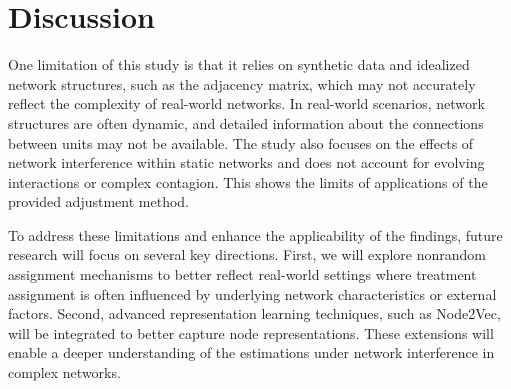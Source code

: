 \documentclass[a4paper,11pt]{article}
\begin{document}
\section{Discussion}
One limitation of this study is that it relies on synthetic data and idealized network structures, such as the adjacency matrix, which may not accurately reflect the complexity of real-world networks. In real-world scenarios, network structures are often dynamic, and detailed information about the connections between units may not be available. The study also focuses on the effects of network interference within static networks and does not account for evolving interactions or complex contagion. This shows the limits of applications of the provided adjustment method.  

To address these limitations and enhance the applicability of the findings, future research will focus on several key directions. First, we will explore nonrandom assignment mechanisms to better reflect real-world settings where treatment assignment is often influenced by underlying network characteristics or external factors. Second, advanced representation learning techniques, such as Node2Vec, will be integrated to better capture node representations. These extensions will enable a deeper understanding of the estimations under network interference in complex networks.


\end{document}
